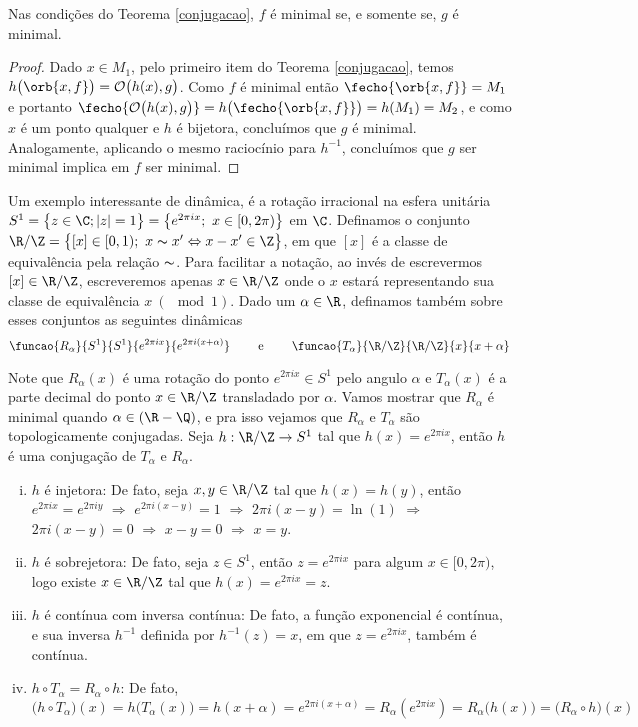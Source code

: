 \begin{corolario}\label{conjminimal} Nas condições do Teorema \ref{conjugacao}, $f$ é minimal se, e somente se, $g$ é minimal.
\end{corolario}

\begin{proof} Dado $x\in M_1$, pelo primeiro item do Teorema \ref{conjugacao}, temos $h\big(\orb{x,f}\big)=\mathcal{O}\big(h(x),g\big)$. Como $f$ é minimal então $\fecho{\orb{x,f}}=M_1$ e portanto $\fecho{\mathcal{O}\big(h(x),g\big)}=h\big(\fecho{\orb{x,f}}\big)=h(M_1)=M_2$, e como $x$ é um ponto qualquer e $h$ é bijetora, concluímos que $g$ é minimal. Analogamente, aplicando o mesmo raciocínio para $h^{-1}$, concluímos que $g$ ser minimal implica em $f$ ser minimal.
\end{proof}

Um exemplo interessante de dinâmica, é a rotação irracional na esfera unitária $S^1=\big\{z\in\C;|z|=1\big\}=\big\{e^{2\pi ix};\ x\in[0,2\pi)\big\}$ em $\C$. Definamos o conjunto $\R/\Z=\big\{[x]\in [0,1);\ x\thicksim x'\Leftrightarrow x-x'\in\Z\big\}$, em que $[x]$ é a classe de equivalência pela relação $\thicksim$. Para facilitar a notação, ao invés de escrevermos $[x]\in\R/\Z$, escreveremos apenas $x\in\R/\Z$ onde o $x$ estará representando sua classe de equivalência $x\ (\mod 1)$. Dado um $\alpha\in\R$, definamos também sobre esses conjuntos as seguintes dinâmicas
\begin{equation*}
\funcao{R_{\alpha}}{S^1}{S^1}{e^{2\pi ix}}{e^{2\pi i(x+\alpha)}}\qquad\text{ e }\qquad \funcao{T_{\alpha}}{\R/\Z}{\R/\Z}{x}{x+\alpha}
\end{equation*}

Note que $R_{\alpha}(x)$ é uma rotação do ponto $e^{2\pi ix}\in S^1$ pelo angulo $\alpha$ e $T_{\alpha}(x)$ é a parte decimal do ponto $x\in\R/\Z$ transladado por $\alpha$. Vamos mostrar que $R_\alpha$ é minimal quando $\alpha\in(\R-\Q)$, e pra isso vejamos que $R_\alpha$ e $T_\alpha$ são topologicamente conjugadas. Seja $h:\R/\Z\to S^1$ tal que $h(x)=e^{2\pi ix}$, então $h$ é uma conjugação de $T_{\alpha}$ e $R_{\alpha}$. 

\begin{enumerate}[i)]
\item $h$ é injetora: De fato, seja $x,y\in \R/\Z$ tal que $h(x)=h(y)$, então $e^{2\pi ix}=e^{2\pi iy}$ $\Rightarrow$ $e^{2\pi i(x-y)}=1$ $\Rightarrow$ $2\pi i(x-y)=\ln(1)$ $\Rightarrow$ $2\pi i(x-y)=0$ $\Rightarrow$ $x-y=0$ $\Rightarrow$ $x=y$.
\item $h$ é sobrejetora: De fato, seja $z\in S^1$, então $z=e^{2\pi ix}$ para algum $x\in[0,2\pi)$, logo existe $x\in\R/\Z$ tal que $h(x)=e^{2\pi ix}=z$.
\item $h$ é contínua com inversa contínua: De fato, a função exponencial é contínua, e sua inversa $h^{-1}$ definida por $h^{-1}(z)=x$, em que $z=e^{2\pi ix}$, também é contínua.
\item $h\circ T_{\alpha}=R_{\alpha}\circ h$: De fato, $\big(h\circ T_{\alpha}\big)(x)=h\big(T_{\alpha}(x)\big)=h(x+\alpha)=e^{2\pi i(x+\alpha)}=R_{\alpha}(e^{2\pi ix})=R_{\alpha}\big(h(x)\big)=\big(R_{\alpha}\circ h\big)(x)$
\end{enumerate}

